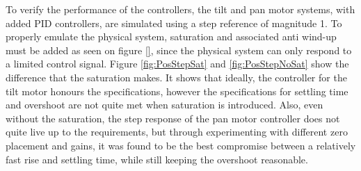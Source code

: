 \documentclass[../../main.tex]{subfiles}
\begin{document}
To verify the performance of the controllers, the tilt and pan motor systems, with added PID controllers, are simulated using a step reference of magnitude 1. To properly emulate the physical system, saturation and associated anti wind-up must be added as seen on figure \ref{}, since the physical system can only respond to a limited control signal. Figure \ref{fig:PosStepSat} and \ref{fig:PosStepNoSat} show the difference that the saturation makes. It shows that ideally, the controller for the tilt motor honours the specifications, however the specifications for settling time and overshoot are not quite met when saturation is introduced. Also, even without the saturation, the step response of the pan motor controller does not quite live up to the  requirements, but through experimenting with different zero placement and gains, it was found to be the best compromise between a relatively fast rise and settling time, while still keeping the overshoot reasonable.
\end{document}
